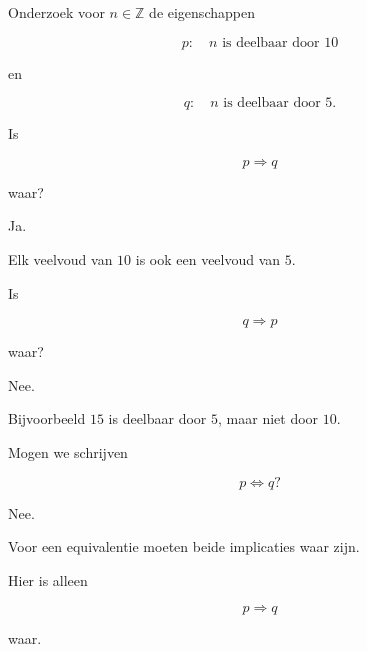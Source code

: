 \documentclass{ximera}
\begin{document}
\begin{oefening}{\oefU\ESS}

Onderzoek voor $n\in\mathbb{Z}$ de eigenschappen

\[
p:\quad n\text{ is deelbaar door }10
\]

en

\[
q:\quad n\text{ is deelbaar door }5.
\]

\begin{question}

Is

\[
p\Rightarrow q
\]

waar?

\begin{oplossing}

Ja.

Elk veelvoud van $10$ is ook een veelvoud van $5$.

\end{oplossing}

\end{question}

\begin{question}

Is

\[
q\Rightarrow p
\]

waar?

\begin{oplossing}

Nee.

Bijvoorbeeld $15$ is deelbaar door $5$, maar niet door $10$.

\end{oplossing}

\end{question}

\begin{question}

Mogen we schrijven

\[
p\Leftrightarrow q?
\]

\begin{oplossing}

Nee.

Voor een equivalentie moeten beide implicaties waar zijn.

Hier is alleen

\[
p\Rightarrow q
\]

waar.

\end{oplossing}

\end{question}

\end{oefening}
\end{document}
